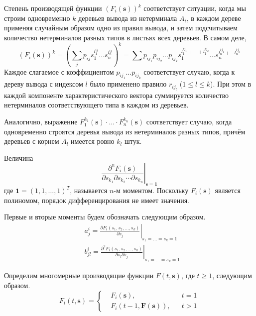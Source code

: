 \documentclass[12pt]{article}
\renewcommand{\leq}{\leqslant}
\renewcommand{\geq}{\geqslant}
\begin{document}
Степень производящей функции $(F_i(\mathbf{s}))^k$ соответствует ситуации, когда мы строим одновременно $k$ деревьев вывода из нетерминала $A_i$, в каждом дереве применяя случайным образом одно из правил вывода, и затем подсчитываем количество нетерминалов разных типов в листьях всех деревьев. В самом деле,
\begin{equation}
\label{eq:f-powers}
	(F_i(\mathbf{s}))^k = \left( \sum_j p_{ij} s_1^{l^{ij}_1} \ldots s_n^{l^{ij}_n} \right)^k = \sum p_{ij_1} p_{ij_2} \ldots p_{ij_k} s_1^{l^{ij_1}_1 + \ldots + l^{ij_k}_1} \ldots s_n^{l^{ij_1}_n + \ldots l^{ij_k}_n}
\end{equation}
Каждое слагаемое с коэффициентом $p_{ij_1} \ldots p_{ij_k}$ соответствует случаю, когда к дереву вывода с индексом $l$ было применено правило $r_{ij_l}$ ($1 \leq l \leq k$). При этом в каждой компоненте характеристического вектора суммируется количество нетерминалов соответствующего типа в каждом из деревьев.

Аналогично, выражение $F_1^{k_1}(\mathbf{s}) \cdot \ldots \cdot F_n^{k_n}(\mathbf{s})$ соответствует случаю, когда одновременно строятся деревья вывода из нетерминалов разных типов, причём деревьев с корнем $A_l$ имеется ровно $k_l$ штук.

Величина
\begin{equation*}
	\left.\frac{\partial^n F_i(\mathbf{s})}{\partial s_{k_1} \partial s_{k_2} \cdots \partial s_{k_n}}\right|_{\mathbf{s} = \mathbf{1}}
\end{equation*}
где $\mathbf{1} = (1, 1, \ldots, 1)^T$, называется $n$-м моментом. Поскольку $F_i(\mathbf{s})$ является полиномом, порядок дифференцирования не имеет значения.

Первые и вторые моменты будем обозначать следующим образом.
\begin{equation}
\label{eq:aij-bij-definition}
\begin{split}
	&a^i_j  = \left. \frac{\partial F_i(s_1, s_2, \ldots, s_k)}{\partial s_j} \right|_{s_1 = \ldots = s_k = 1} \\
	&b^i_{jl} = \left. \frac{\partial^2 F_i(s_1, s_2, \ldots, s_k)}{\partial s_l \partial s_j} \right|_{s_1 = \ldots = s_k = 1}
\end{split}
\end{equation}

Определим многомерные производящие функции $F(t, \mathbf{s})$, где $t \geq 1$, следующим образом.
\begin{equation*}
	F_i(t, \mathbf{s}) = \left\{
	\begin{split}
		&F_i(\mathbf{s}), & &t = 1 \\
		&F_i(t-1, \mathbf{F}(\mathbf{s})), & &t > 1
	\end{split}
	\right.
\end{equation*}
\end{document}
